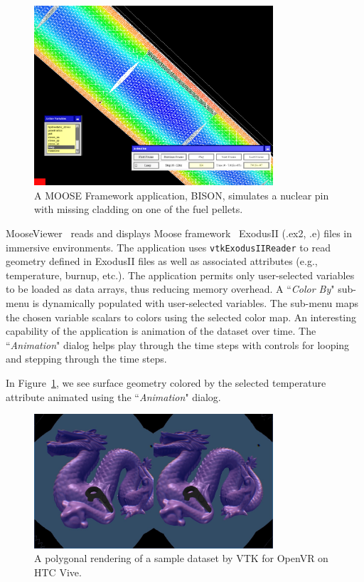 \begin{figure}[h!]
 \centering
 \includegraphics[width=3.5in]{images/fuelpin.png}
 \caption{A MOOSE Framework application, BISON, simulates a nuclear pin with missing cladding on one of the fuel pellets.}
 \label{fig:fuelpin}
\end{figure}

MooseViewer~\cite{MooseViewer} reads and displays Moose framework~\cite{Gaston:2015, MooseFramework} ExodusII (.ex2, .e) files in immersive environments. The application uses \texttt{vtkExodusIIReader} to read geometry defined in ExodusII files as well as associated attributes (e.g., temperature, burnup, etc.). The application permits only user-selected variables to be loaded as data arrays, thus reducing memory overhead. A ``\textit{Color By}" sub-menu is dynamically populated with user-selected variables. The sub-menu maps the chosen variable scalars to colors using the selected color map.
An interesting capability of the application is animation of the dataset over time.
The ``\textit{Animation}" dialog helps play through the time steps with controls for looping and stepping through the time steps.

In Figure~\ref{fig:fuelpin}, we see surface geometry colored by the selected temperature attribute animated using the ``\textit{Animation}" dialog.

\begin{figure}[h!]
  \centering
  \includegraphics[width=3.5in]{images/Dragon.jpg}
  \caption{A polygonal rendering of a sample dataset by VTK for OpenVR on HTC Vive.}
  \label{fig:openvrdragon}
\end{figure}

